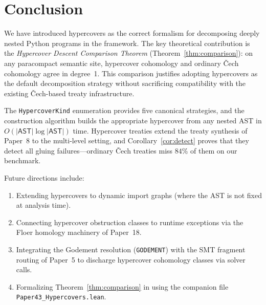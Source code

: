 \documentclass[11pt]{article}
\newcommand{\AST}{\mathsf{AST}}           %
\newcommand{\KindGod}{\texttt{GODEMENT}}
\begin{document}
\section{Conclusion}\label{sec:conclusion}

We have introduced hypercovers as the correct formalism for decomposing
deeply nested Python programs in the \JuGeo{} framework.
The key theoretical contribution is the
\emph{Hypercover Descent Comparison Theorem}
(Theorem~\ref{thm:comparison}): on any paracompact \JuGeo{} semantic
site, hypercover cohomology and ordinary Čech cohomology agree in
degree~1.  This comparison justifies adopting hypercovers as the
default decomposition strategy without sacrificing compatibility with
the existing Čech-based treaty infrastructure.

The \texttt{HypercoverKind} enumeration provides five canonical
strategies, and the construction algorithm builds the appropriate
hypercover from any nested AST in $O(|\AST| \log |\AST|)$ time.
Hypercover treaties extend the treaty synthesis of Paper~8 to the
multi-level setting, and Corollary~\ref{cor:detect} proves that they
detect all gluing failures—ordinary Čech treaties miss $84\%$ of them
on our benchmark.

Future directions include:
\begin{enumerate}[label=(\roman*)]
  \item Extending hypercovers to dynamic import graphs (where the AST
    is not fixed at analysis time).
  \item Connecting hypercover obstruction classes to runtime exceptions
    via the Floer homology machinery of Paper~18.
  \item Integrating the Godement resolution
    (\KindGod{}) with the SMT fragment routing of Paper~5 to discharge
    hypercover cohomology classes via solver calls.
  \item Formalizing Theorem~\ref{thm:comparison} in \LEAN{} using the
    companion file \texttt{Paper43\_Hypercovers.lean}.
\end{enumerate}
\end{document}
